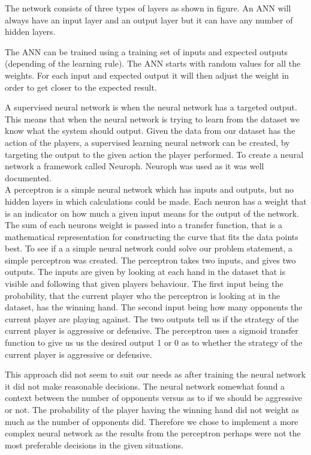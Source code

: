 The network consists of three types of layers as shown in figure. An ANN will always have an input layer and an output layer but it can have any number of hidden layers.

The ANN can be trained using a training set of inputs and expected outputs (depending of the learning rule). The ANN starts with random values for all the weights. For each input and expected output it will then adjust the weight in order to get closer to the expected result.   

A supervised neural network is when the neural network has a targeted output. This means that when the neural network is trying to learn from the dataset we know what the system should output. Given the data from our dataset has the action of the players, a supervised learning neural network can be created, by targeting the output to the given action the player performed. To create a neural network a framework called Neuroph. Neuroph was used as it was well documented.\\

A perceptron is a simple neural network which has inputs and outputs, but no hidden layers in which calculations could be made. Each neuron has a weight that is an indicator on how much a given input means for the output of the network. The sum of each neurons weight is passed into a transfer function, that is a mathematical representation for constructing the curve that fits the data points best.
To see if a a simple neural network could solve our problem statement, a simple perceptron was created. The perceptron takes two inputs, and gives two outputs. The inputs are given by looking at each hand in the dataset that is visible and following that given players behaviour.
The first input being the probability, that the current player who the perceptron is looking at in the dataset, has the winning hand. The second input being how many opponents the current player are playing against. 
The two outputs tell us if the strategy of the current player is aggressive or defensive. 
The perceptron uses a sigmoid transfer function to give us us the desired output 1 or 0 as to whether the strategy of the current player is aggressive or defensive.

This approach did not seem to suit our needs as after training the neural network it did not make reasonable decisions. The neural network somewhat found a context between the number of opponents versus as to if we should be aggressive or not. The probability of the player having the winning hand did not weight as much as the number of opponents did. Therefore we chose to implement a more complex neural network as the results from the perceptron perhaps were not the most preferable decisions in the given situations.\\


